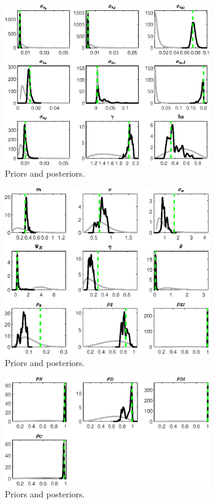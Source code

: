  
\begin{figure}[H]
\centering
\includegraphics[width=0.80\textwidth]{BRS_growth_util_sectoral/Output/BRS_growth_util_sectoral_PriorsAndPosteriors1}
\caption{Priors and posteriors.}\label{Fig:PriorsAndPosteriors:1}
\end{figure}
 
\begin{figure}[H]
\centering
\includegraphics[width=0.80\textwidth]{BRS_growth_util_sectoral/Output/BRS_growth_util_sectoral_PriorsAndPosteriors2}
\caption{Priors and posteriors.}\label{Fig:PriorsAndPosteriors:2}
\end{figure}
 
\begin{figure}[H]
\centering
\includegraphics[width=0.80\textwidth]{BRS_growth_util_sectoral/Output/BRS_growth_util_sectoral_PriorsAndPosteriors3}
\caption{Priors and posteriors.}\label{Fig:PriorsAndPosteriors:3}
\end{figure}
 
